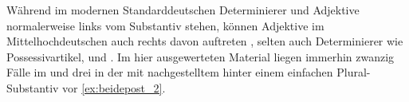

Während im modernen Standarddeutschen Determinierer und Adjektive normalerweise
links vom Substantiv stehen, können Adjektive im Mittelhochdeutschen
auch rechts davon auftreten \autocite[185--186, 237--243]{ksw2}, selten auch
Determinierer wie Possessivartikel,   und 
\autocite[515--517, 551--552, 623--624]{ksw2}. Im hier ausgewerteten Material
liegen immerhin zwanzig Fälle im \CAO{} und drei in der 
mit nachgestelltem  hinter einem einfachen Plural-Substantiv vor
\cref{ex:beidepost_2}.

